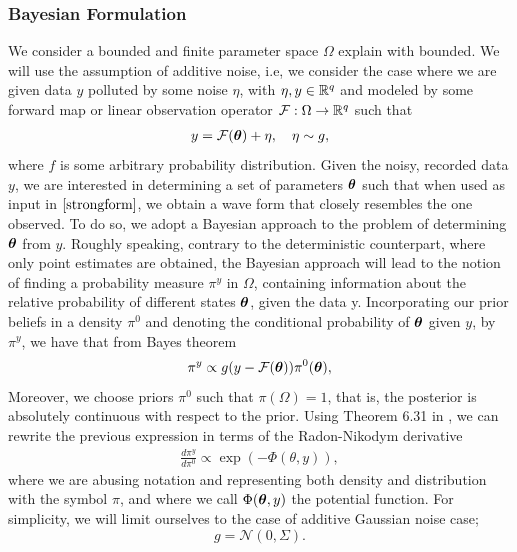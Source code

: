 \subsubsection{Bayesian Formulation}
We consider a bounded and finite parameter space $\Omega$ \color{red} explain with bounded.\color{black} We will use the assumption of additive noise, i.e, we consider the case where we are given data $y$ polluted by some noise $\eta$, with $\eta,y\in \mathbb{R}^q$ and modeled by some forward map or linear observation operator $\mathcal{F}:\Omega\rightarrow\mathbb{R}^q$ such that
\begin{align}
y=\mathcal{F}(\bm{\theta})+\eta, \quad \eta\sim g,
\end{align}
 where $f$ is some arbitrary probability distribution. Given the noisy, recorded data $y$, we are interested in determining a set of parameters $\bm{\theta}$ such that when used as input in $\ref{strongform}$, we obtain a wave form that closely resembles the one observed. To do so, we adopt a    Bayesian approach to the problem of determining $\bm{\theta}$ from $y$.  Roughly speaking, contrary to the deterministic counterpart, where only point estimates are obtained, the
Bayesian approach will lead to the notion of finding a probability measure
$\pi^y$ in $\Omega$, containing information about the relative probability of different
states $\bm{\theta}$, given the data y. Incorporating our prior beliefs in a density $\pi^0$ and denoting the conditional probability of $\bm{\theta}$ given $y$, by $\pi^y$, we have that from Bayes theorem \begin{align}
\pi^y\propto g(y-\mathcal{F}(\bm{\theta}))\pi^0(\bm{\theta}),
\end{align}
Moreover, we choose priors $\pi^0$ such that $\pi(\Omega)=1$, that is, the posterior is absolutely continuous with respect to the prior. Using Theorem 6.31 in \cite{stuart2010inverse}, we can rewrite the previous expression in terms of the Radon-Nikodym derivative \begin{align}\label{eq:radon}
\frac{d\pi^y}{d\pi^0}\propto\exp(-\Phi(\theta,y)),
\end{align}
where we are abusing notation and representing both density and distribution with the symbol $\pi$, and where we call $\Phi(\bm{\theta},y)$ the potential function. For simplicity, we will limit ourselves to the case of additive Gaussian noise case; $$g=\mathcal{N}(0,\Sigma).$$


